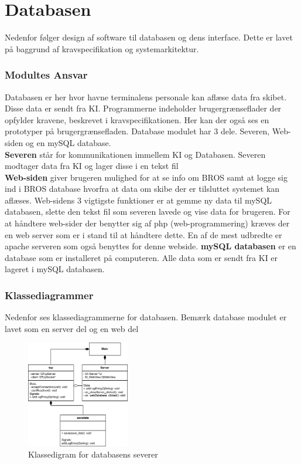 \chapter{Databasen}
Nedenfor følger design af software til databasen og dens interface. Dette er lavet på baggrund af kravspecifikation og systemarkitektur. 



\subsection{Modultes Ansvar}
Databasen er her hvor havne terminalens personale kan aflæse data fra skibet. Disse data er sendt fra KI. Programmerne indeholder brugergrænseflader der opfylder kravene, beskrevet i kravspecifikationen. Her kan der også ses en prototyper på brugergrænsefladen.
Database modulet har 3 dele. Severen, Web-siden og en mySQL database. \\
\textbf{Severen} står for kommunikationen immellem KI og Databasen. Severen modtager data fra KI og lager disse i en tekst fil\\
\textbf{Web-siden} giver brugeren mulighed for at se info om BROS samt at logge sig ind i BROS database hvorfra at data om skibe der er tilsluttet systemet kan aflæses. Web-sidens 3 vigtigste funktioner er at gemme ny data til mySQL databasen, slette den tekst fil som severen lavede og vise data for brugeren. For at håndtere web-sider der benytter sig af php (web-programmering) kræves der en web server som er i stand til at håndtere dette. En af de mest udbredte er apache serveren som også benyttes for denne webside.
\textbf{mySQL databasen} er en database som er  installeret på computeren. Alle data som er sendt fra KI er lageret i mySQL databasen.

\subsection{Klassediagrammer}
Nedenfor ses klassediagrammerne for databasen. Bemærk database modulet er lavet som en server del og en web del

\begin{figure}[htbp]
	\centering
	\includegraphics[width=0.4\textwidth]{billeder/serverKlassediagram}
	\caption{Klassedigram for databasens severer}
	\label{fig:serverKlassediagram}
\end{figure}

